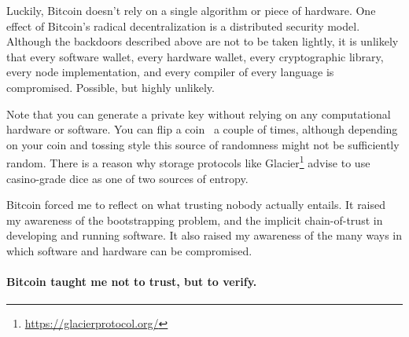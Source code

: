 Luckily, Bitcoin doesn't rely on a single algorithm or piece of
hardware. One effect of Bitcoin's radical decentralization is a
distributed security model. Although the backdoors described above are
not to be taken lightly, it is unlikely that every software wallet,
every hardware wallet, every cryptographic library, every node
implementation, and every compiler of every language is compromised.
Possible, but highly unlikely.

Note that you can generate a private key without relying on any computational
hardware or software. You can flip a coin~\cite{antonopoulos2014mastering} a
couple of times, although depending on your coin and tossing style this source
of randomness might not be sufficiently random. There is a reason why storage
protocols like Glacier\footnote{\url{https://glacierprotocol.org/}} advise to
use casino-grade dice as one of two sources of entropy.

Bitcoin forced me to reflect on what trusting nobody actually entails.
It raised my awareness of the bootstrapping problem, and the implicit
chain-of-trust in developing and running software. It also raised my
awareness of the many ways in which software and hardware can be
compromised.

\paragraph{Bitcoin taught me not to trust, but to verify.}

%
%
%
%
